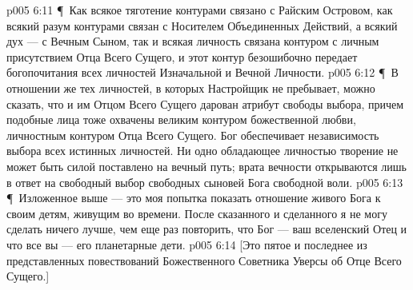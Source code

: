 \vs p005 6:11 \P\ Как всякое тяготение контурами связано с Райским Островом, как всякий разум контурами связан с Носителем Объединенных Действий, а всякий дух --- с Вечным Сыном, так и всякая личность связана контуром с личным присутствием Отца Всего Сущего, и этот контур безошибочно передает богопочитания всех личностей Изначальной и Вечной Личности.
\vs p005 6:12 \P\ В отношении же тех личностей, в которых Настройщик не пребывает, можно сказать, что и им Отцом Всего Сущего дарован атрибут свободы выбора, причем подобные лица тоже охвачены великим контуром божественной любви, личностным контуром Отца Всего Сущего. Бог обеспечивает независимость выбора всех истинных личностей. Ни одно обладающее личностью творение не может быть силой поставлено на вечный путь; врата вечности открываются лишь в ответ на свободный выбор свободных сыновей Бога свободной воли.
\vs p005 6:13 \P\ Изложенное выше --- это моя попытка показать отношение живого Бога к своим детям, живущим во времени. После сказанного и сделанного я не могу сделать ничего лучше, чем еще раз повторить, что Бог --- ваш вселенский Отец и что все вы --- его планетарные дети.
\vs p005 6:14 [Это пятое и последнее из представленных повествований Божественного Советника Уверсы об Отце Всего Сущего.]
